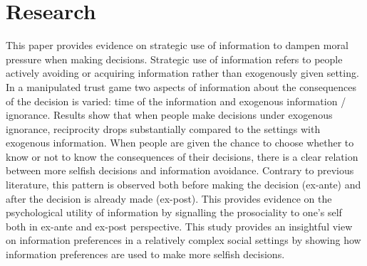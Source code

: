 \documentclass[10pt,a4paper,roman]{moderncv} %
\begin{document}
\section{Research}
\cvitem{}        {This paper provides evidence on strategic use of information to dampen moral pressure when making decisions. Strategic use of information refers to people actively avoiding or acquiring information rather than exogenously given setting. In a manipulated trust game two aspects of information about the consequences of the decision is varied: time of the information and exogenous information / ignorance. Results show that when people make decisions under exogenous ignorance, reciprocity drops substantially compared to the settings with exogenous information. When people are given the chance to choose whether to know or not to know the consequences of their decisions, there is a clear relation between more selfish decisions and information avoidance. Contrary to previous literature, this pattern is observed both before making the decision (ex-ante) and after the decision is already made (ex-post). This provides evidence on the psychological utility of information by signalling the prosociality to one's self both in ex-ante and ex-post perspective. This study provides an insightful view on information preferences in a relatively complex social settings by showing how information preferences are used to make more selfish decisions.}


\end{document}
